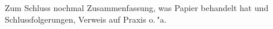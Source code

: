 
Zum Schluss nochmal Zusammenfassung, was Papier behandelt hat und 
Schlussfolgerungen, Verweis auf Praxis o.\,"a.
